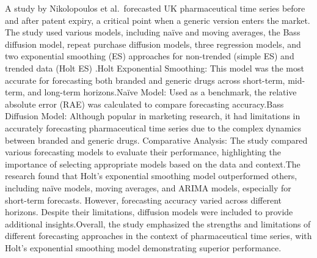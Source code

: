 \documentclass[
  authoryear,
  preprint,
  3p]{elsarticle}
\begin{document}
A study by Nikolopoulos et al.~forecasted UK pharmaceutical time series
before and after patent expiry, a critical point when a generic version
enters the market. The study used various models, including naïve and
moving averages, the Bass diffusion model, repeat purchase diffusion
models, three regression models, and two exponential smoothing (ES)
approaches for non-trended (simple ES) and trended data (Holt ES)
\citep{nikolopoulos2016forecasting}.Holt Exponential Smoothing: This
model was the most accurate for forecasting both branded and generic
drugs across short-term, mid-term, and long-term horizons.Naïve Model:
Used as a benchmark, the relative absolute error (RAE) was calculated to
compare forecasting accuracy.Bass Diffusion Model: Although popular in
marketing research, it had limitations in accurately forecasting
pharmaceutical time series due to the complex dynamics between branded
and generic drugs. Comparative Analysis: The study compared various
forecasting models to evaluate their performance, highlighting the
importance of selecting appropriate models based on the data and
context.The research found that Holt's exponential smoothing model
outperformed others, including naïve models, moving averages, and ARIMA
models, especially for short-term forecasts. However, forecasting
accuracy varied across different horizons. Despite their limitations,
diffusion models were included to provide additional insights.Overall,
the study emphasized the strengths and limitations of different
forecasting approaches in the context of pharmaceutical time series,
with Holt's exponential smoothing model demonstrating superior
performance\citep{nikolopoulos2016forecasting}.
\end{document}
